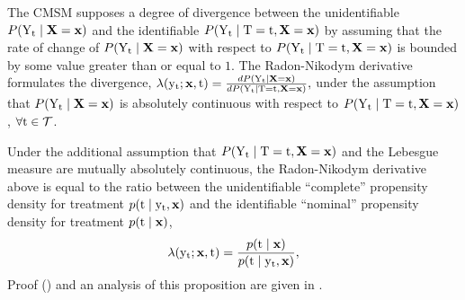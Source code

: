 The CMSM supposes a degree of divergence between the unidentifiable $P(\mathrm{Y}_{\mathrm{t}} \mid \mathbf{X}=\mathbf{x})$ and the identifiable $P(\mathrm{Y}_{\mathrm{t}} \mid \mathrm{T}=\mathrm{t}, \mathbf{X}=\mathbf{x})$ by assuming that the rate of change of $P(\mathrm{Y}_{\mathrm{t}} \mid \mathbf{X}=\mathbf{x})$ with respect to $P(\mathrm{Y}_{\mathrm{t}} \mid \mathrm{T}=\mathrm{t}, \mathbf{X}=\mathbf{x})$ is bounded by some value greater than or equal to $1$.
The Radon-Nikodym derivative formulates the divergence,
$
    \lambda(\mathrm{y}_{\mathrm{t}}; \mathbf{x}, \mathrm{t}) = \frac{dP(\mathrm{Y}_{\mathrm{t}} \mid \mathbf{X}=\mathbf{x})}{dP(\mathrm{Y}_{\mathrm{t}} \mid \mathrm{T}=\mathrm{t}, \mathbf{X}=\mathbf{x})},
$
under the assumption that $P(\mathrm{Y}_{\mathrm{t}} \mid \mathbf{X}=\mathbf{x})$ is absolutely continuous with respect to $P(\mathrm{Y}_{\mathrm{t}} \mid \mathrm{T}=\mathrm{t}, \mathbf{X}=\mathbf{x})$, $\forall\mathrm{t} \in \mathcal{T}$.
\begin{proposition}
    \label{prop:density_ratio}
    Under the additional assumption that $P(\mathrm{Y}_{\mathrm{t}} \mid \mathrm{T}=\mathrm{t}, \mathbf{X}=\mathbf{x})$ and the Lebesgue measure are mutually absolutely continuous, the Radon-Nikodym derivative above is equal to the ratio between the unidentifiable ``complete'' propensity density for treatment $p(\mathrm{t} \mid \mathrm{y}_{\mathrm{t}}, \mathbf{x})$ and the identifiable ``nominal'' propensity density for treatment $p(\mathrm{t} \mid \mathbf{x})$,
    \begin{equation}
        \lambda(\mathrm{y}_{\mathrm{t}}; \mathbf{x}, \mathrm{t}) = \frac{p(\mathrm{t} \mid \mathbf{x})}{p(\mathrm{t} \mid \mathrm{y}_{\mathrm{t}}, \mathbf{x})},
    \end{equation}
    Proof () and an analysis of this proposition are given in .
\end{proposition}

